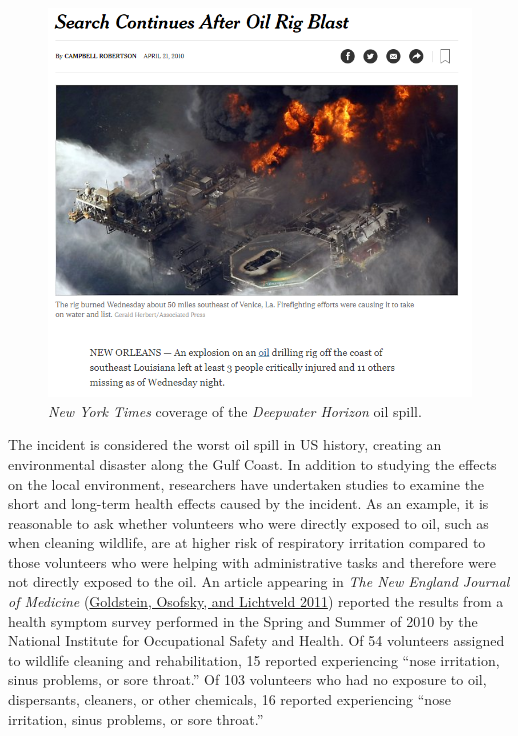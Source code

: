 \documentclass[
]{book}
\theoremstyle{plain}
\theoremstyle{mydefn}
\theoremstyle{myexmpl}
\theoremstyle{remark}
\begin{document}
\begin{figure}

{\centering \includegraphics[width=0.8\linewidth]{./images/Case-Deepwater-NYTclip} 

}

\caption{\emph{New York Times} coverage of the \emph{Deepwater Horizon} oil spill.}\label{fig:casedeepwater-nytclip}
\end{figure}

The incident is considered the worst oil spill in US history, creating an environmental disaster along the Gulf Coast. In addition to studying the effects on the local environment, researchers have undertaken studies to examine the short and long-term health effects caused by the incident. As an example, it is reasonable to ask whether volunteers who were directly exposed to oil, such as when cleaning wildlife, are at higher risk of respiratory irritation compared to those volunteers who were helping with administrative tasks and therefore were not directly exposed to the oil. An article appearing in \emph{The New England Journal of Medicine} (\protect\hyperlink{ref-Goldstein2011}{Goldstein, Osofsky, and Lichtveld 2011}) reported the results from a health symptom survey performed in the Spring and Summer of 2010 by the National Institute for Occupational Safety and Health. Of 54 volunteers assigned to wildlife cleaning and rehabilitation, 15 reported experiencing ``nose irritation, sinus problems, or sore throat.'' Of 103 volunteers who had no exposure to oil, dispersants, cleaners, or other chemicals, 16 reported experiencing ``nose irritation, sinus problems, or sore throat.''
\end{document}
